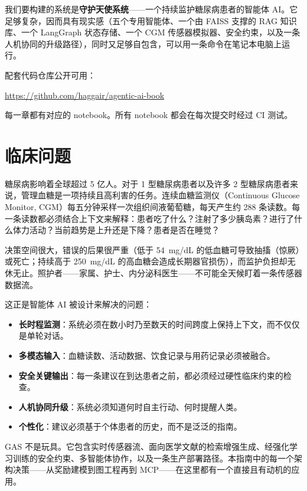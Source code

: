 \documentclass[11pt,a4paper,openany]{book}
\begin{document}
我们要构建的系统是\textbf{守护天使系统}——一个持续监护糖尿病患者的智能体 AI。它足够复杂，因而具有现实感（五个专用智能体、一个由 FAISS 支撑的 RAG 知识库、一个 LangGraph 状态存储、一个 CGM 传感器模拟器、安全约束，以及一条人机协同的升级路径），同时又足够自包含，可以用一条命令在笔记本电脑上运行。

配套代码仓库公开可用：
\begin{center}
\url{https://github.com/haggair/agentic-ai-book}
\end{center}
每一章都有对应的 notebook。所有 notebook 都会在每次提交时经过 CI 测试。

\section*{临床问题}
\label{gas-clinical}

糖尿病影响着全球超过 5 亿人。对于 1 型糖尿病患者以及许多 2 型糖尿病患者来说，管理血糖是一项持续且高利害的任务。连续血糖监测仪（Continuous Glucose Monitor, CGM）每五分钟采样一次组织间液葡萄糖，每天产生约 288 条读数。每一条读数都必须结合上下文来解释：患者吃了什么？注射了多少胰岛素？进行了什么体力活动？当前趋势是上升还是下降？患者是否在睡觉？

决策空间很大，错误的后果很严重（低于 54~mg/dL 的低血糖可导致抽搐（惊厥）或死亡；持续高于 250~mg/dL 的高血糖会造成长期器官损伤），而监护负担却无休无止。照护者——家属、护士、内分泌科医生——不可能全天候盯着一条传感器数据流。

这正是智能体 AI 被设计来解决的问题：

\begin{itemize}
  \item \textbf{长时程监测}：系统必须在数小时乃至数天的时间跨度上保持上下文，而不仅仅是单轮对话。
  \item \textbf{多模态输入}：血糖读数、活动数据、饮食记录与用药记录必须被融合。
  \item \textbf{安全关键输出}：每一条建议在到达患者之前，都必须经过硬性临床约束的检查。
  \item \textbf{人机协同升级}：系统必须知道何时自主行动、何时提醒人类。
  \item \textbf{个性化}：建议必须基于个体患者的历史，而不是泛泛的指南。
\end{itemize}

\begin{intuitionbox}[为什么糖尿病管理是一个完美的智能体问题]
GAS 不是玩具。它包含实时传感器流、面向医学文献的检索增强生成、经强化学习训练的安全约束、多智能体协作，以及一条生产部署路径。本指南中的每一个架构决策——从奖励建模到图工程再到 MCP——在这里都有一个直接且有动机的应用。
\end{intuitionbox}
\end{document}
